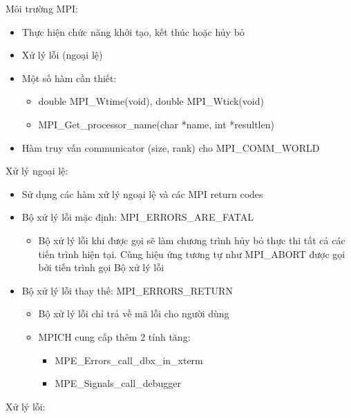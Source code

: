 \documentclass[14pt, a4paper]{article}
\numberwithin{equation}{section}
\numberwithin{figure}{section}
\numberwithin{dl}{section}
\numberwithin{md}{section}
\numberwithin{bd}{section}
\numberwithin{dn}{section}
\numberwithin{hq}{section}
\begin{document}
Môi trường MPI:

\begin{itemize}
    \item Thực hiện chức năng khởi tạo, kết thúc hoặc hủy bỏ
    \item Xử lý lỗi (ngoại lệ)
    \item Một số hàm cần thiết:
    \begin{itemize}
        \item double MPI\_Wtime(void), double MPI\_Wtick(void)
        \item MPI\_Get\_processor\_name(char *name, int *resultlen)
    \end{itemize}
    \item Hàm truy vấn communicator (size, rank) cho MPI\_COMM\_WORLD
\end{itemize}

Xử lý ngoại lệ:

\begin{itemize}
    \item Sử dụng các hàm xử lý ngoại lệ và các MPI return codes
    \item Bộ xử lý lỗi mặc định: MPI\_ERRORS\_ARE\_FATAL
    \begin{itemize}
        \item Bộ xử lý lỗi khi được gọi sẽ làm chương trình hủy bỏ thực thi tất cả các tiến trình hiện tại.
        Cùng hiệu ứng tương tự như MPI\_ABORT được gọi bởi tiến trình gọi Bộ xử lý lỗi
    \end{itemize}
    \item Bộ xử lý lỗi thay thế: MPI\_ERRORS\_RETURN
    \begin{itemize}
        \item Bộ xử lý lỗi chỉ trả về mã lỗi cho người dùng
        \item MPICH cung cấp thêm 2 tính tăng:
        \begin{itemize}
            \item MPE\_Errors\_call\_dbx\_in\_xterm
            \item MPE\_Signals\_call\_debugger 
        \end{itemize}
    \end{itemize}
\end{itemize}

Xử lý lỗi:
\end{document}
